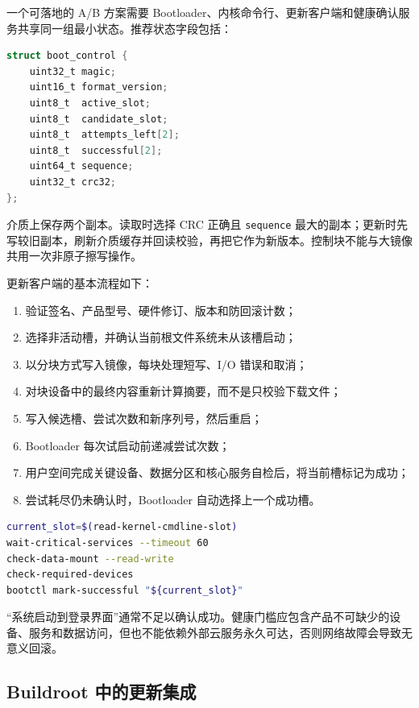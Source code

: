 一个可落地的 A/B 方案需要 Bootloader、内核命令行、更新客户端和健康确认服务共享同一组最小状态。推荐状态字段包括：

\begin{lstlisting}[language=C,caption={冗余启动控制块的逻辑结构}]
struct boot_control {
    uint32_t magic;
    uint16_t format_version;
    uint8_t  active_slot;
    uint8_t  candidate_slot;
    uint8_t  attempts_left[2];
    uint8_t  successful[2];
    uint64_t sequence;
    uint32_t crc32;
};
\end{lstlisting}

介质上保存两个副本。读取时选择 CRC 正确且 \texttt{sequence} 最大的副本；更新时先写较旧副本，刷新介质缓存并回读校验，再把它作为新版本。控制块不能与大镜像共用一次非原子擦写操作。

更新客户端的基本流程如下：

\begin{enumerate}
  \item 验证签名、产品型号、硬件修订、版本和防回滚计数；
  \item 选择非活动槽，并确认当前根文件系统未从该槽启动；
  \item 以分块方式写入镜像，每块处理短写、I/O 错误和取消；
  \item 对块设备中的最终内容重新计算摘要，而不是只校验下载文件；
  \item 写入候选槽、尝试次数和新序列号，然后重启；
  \item Bootloader 每次试启动前递减尝试次数；
  \item 用户空间完成关键设备、数据分区和核心服务自检后，将当前槽标记为成功；
  \item 尝试耗尽仍未确认时，Bootloader 自动选择上一个成功槽。
\end{enumerate}

\begin{lstlisting}[language=bash,caption={健康确认服务的最小策略（伪代码）}]
current_slot=$(read-kernel-cmdline-slot)
wait-critical-services --timeout 60
check-data-mount --read-write
check-required-devices
bootctl mark-successful "${current_slot}"
\end{lstlisting}

“系统启动到登录界面”通常不足以确认成功。健康门槛应包含产品不可缺少的设备、服务和数据访问，但也不能依赖外部云服务永久可达，否则网络故障会导致无意义回滚。

\subsection{Buildroot 中的更新集成}

